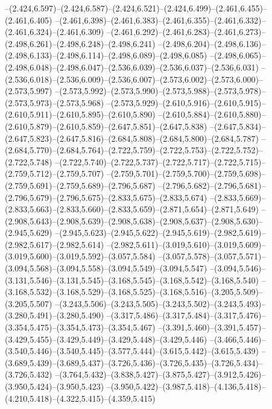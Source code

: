   --(2.424,6.597)--(2.424,6.587)--(2.424,6.521)--(2.424,6.499)--(2.461,6.455)--(2.461,6.405)%
  --(2.461,6.398)--(2.461,6.383)--(2.461,6.355)--(2.461,6.332)--(2.461,6.324)--(2.461,6.309)%
  --(2.461,6.292)--(2.461,6.283)--(2.461,6.273)--(2.498,6.261)--(2.498,6.248)--(2.498,6.241)%
  --(2.498,6.204)--(2.498,6.136)--(2.498,6.133)--(2.498,6.114)--(2.498,6.089)--(2.498,6.085)%
  --(2.498,6.065)--(2.498,6.048)--(2.498,6.047)--(2.536,6.039)--(2.536,6.037)--(2.536,6.031)%
  --(2.536,6.018)--(2.536,6.009)--(2.536,6.007)--(2.573,6.002)--(2.573,6.000)--(2.573,5.997)%
  --(2.573,5.992)--(2.573,5.990)--(2.573,5.988)--(2.573,5.978)--(2.573,5.973)--(2.573,5.968)%
  --(2.573,5.929)--(2.610,5.916)--(2.610,5.915)--(2.610,5.911)--(2.610,5.895)--(2.610,5.890)%
  --(2.610,5.884)--(2.610,5.880)--(2.610,5.879)--(2.610,5.859)--(2.647,5.851)--(2.647,5.838)%
  --(2.647,5.834)--(2.647,5.823)--(2.647,5.816)--(2.684,5.808)--(2.684,5.800)--(2.684,5.787)%
  --(2.684,5.770)--(2.684,5.764)--(2.722,5.759)--(2.722,5.753)--(2.722,5.752)--(2.722,5.748)%
  --(2.722,5.740)--(2.722,5.737)--(2.722,5.717)--(2.722,5.715)--(2.759,5.712)--(2.759,5.707)%
  --(2.759,5.701)--(2.759,5.700)--(2.759,5.698)--(2.759,5.691)--(2.759,5.689)--(2.796,5.687)%
  --(2.796,5.682)--(2.796,5.681)--(2.796,5.679)--(2.796,5.675)--(2.833,5.675)--(2.833,5.674)%
  --(2.833,5.669)--(2.833,5.663)--(2.833,5.660)--(2.833,5.659)--(2.871,5.654)--(2.871,5.649)%
  --(2.908,5.643)--(2.908,5.639)--(2.908,5.638)--(2.908,5.637)--(2.908,5.630)--(2.945,5.629)%
  --(2.945,5.623)--(2.945,5.622)--(2.945,5.619)--(2.982,5.619)--(2.982,5.617)--(2.982,5.614)%
  --(2.982,5.611)--(3.019,5.610)--(3.019,5.609)--(3.019,5.600)--(3.019,5.592)--(3.057,5.584)%
  --(3.057,5.578)--(3.057,5.571)--(3.094,5.568)--(3.094,5.558)--(3.094,5.549)--(3.094,5.547)%
  --(3.094,5.546)--(3.131,5.546)--(3.131,5.545)--(3.168,5.545)--(3.168,5.542)--(3.168,5.540)%
  --(3.168,5.532)--(3.168,5.529)--(3.168,5.525)--(3.168,5.516)--(3.205,5.509)--(3.205,5.507)%
  --(3.243,5.506)--(3.243,5.505)--(3.243,5.502)--(3.243,5.493)--(3.280,5.491)--(3.280,5.490)%
  --(3.317,5.486)--(3.317,5.484)--(3.317,5.476)--(3.354,5.475)--(3.354,5.473)--(3.354,5.467)%
  --(3.391,5.460)--(3.391,5.457)--(3.429,5.455)--(3.429,5.449)--(3.429,5.448)--(3.429,5.446)%
  --(3.466,5.446)--(3.540,5.446)--(3.540,5.445)--(3.577,5.444)--(3.615,5.442)--(3.615,5.439)%
  --(3.689,5.439)--(3.689,5.437)--(3.726,5.436)--(3.726,5.435)--(3.726,5.434)--(3.726,5.432)%
  --(3.764,5.432)--(3.838,5.427)--(3.875,5.427)--(3.912,5.426)--(3.950,5.424)--(3.950,5.423)%
  --(3.950,5.422)--(3.987,5.418)--(4.136,5.418)--(4.210,5.418)--(4.322,5.415)--(4.359,5.415)%
